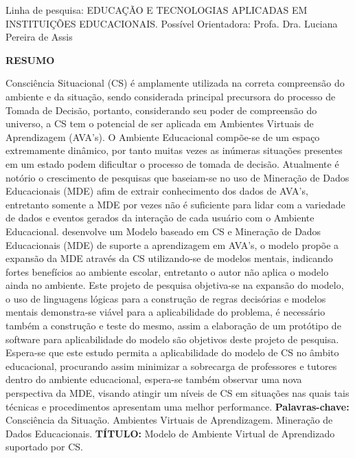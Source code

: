 \documentclass[
	oneside,
	12pt,				%
	a4paper,			%
	english,			%
	brazil,				%
	article
	]{abntex2}
\renewcommand{\imprimircapa}{%
	\begin{capa}%
		\center	
		{\ABNTEXchapterfont\imprimirinstituicao}
		\vfill
		\begin{center}
			\ABNTEXchapterfont\bfseries\imprimirtitulo
		\end{center}
		\vspace*{3cm}
		\begin{flushright}
		Linha de pesquisa: EDUCAÇÃO E TECNOLOGIAS APLICADAS EM INSTITUIÇÕES
		EDUCACIONAIS.
		\linebreak
		Possível Orientadora: Profa. Dra. Luciana Pereira de Assis
		\end{flushright}
		\vfill
		\imprimirlocal 
		\linebreak		
		\imprimirdata
		\vspace*{1cm}
	\end{capa}
}
\begin{document}
 

\frenchspacing 

\imprimircapa

\textual

\OnehalfSpacing %
\begin{center}
	\ABNTEXchapterfont\bfseries RESUMO
\end{center}

Consciência Situacional (CS) é amplamente utilizada na correta compreensão do ambiente e da situação, sendo considerada principal precursora do processo de Tomada de Decisão, portanto, considerando seu poder de compreensão do universo, a CS tem o potencial de ser aplicada em Ambientes Virtuais de Aprendizagem (AVA’s).
O Ambiente Educacional compõe-se de um espaço extremamente dinâmico, por tanto muitas vezes as inúmeras situações presentes em um estado podem dificultar o processo de tomada de decisão. Atualmente é notório o crescimento de pesquisas que baseiam-se no uso de Mineração de Dados Educacionais (MDE) afim de extrair conhecimento dos dados de AVA's, entretanto somente a MDE por vezes não é suficiente para lidar com a variedade de dados e eventos gerados da interação de cada usuário com o Ambiente Educacional.  desenvolve um Modelo baseado em CS e Mineração de Dados Educacionais (MDE) de suporte a aprendizagem em AVA's, o modelo propõe a expansão da MDE através da CS utilizando-se de modelos mentais, indicando fortes benefícios ao ambiente escolar, entretanto o autor não aplica o modelo ainda no ambiente. Este projeto de pesquisa objetiva-se na expansão do modelo, o uso de linguagens lógicas para a construção de regras decisórias e modelos mentais demonstra-se viável para a aplicabilidade do problema, é necessário também a construção e teste do mesmo, assim a elaboração de um protótipo de software para aplicabilidade do modelo são objetivos deste projeto de pesquisa. Espera-se que este estudo permita a aplicabilidade do modelo de CS no âmbito educacional, procurando assim minimizar a sobrecarga de professores e tutores dentro do ambiente educacional, espera-se também observar uma nova perspectiva da MDE, visando atingir um níveis de CS em situações nas quais tais técnicas e procedimentos apresentam uma melhor performance. 
\linebreak\linebreak
\textbf{Palavras-chave:} Consciência da Situação. Ambientes Virtuais de Aprendizagem. Mineração de Dados Educacionais. 
\linebreak\linebreak
\textbf{TÍTULO:} Modelo de Ambiente Virtual de Aprendizado suportado por CS.
\end{document}
